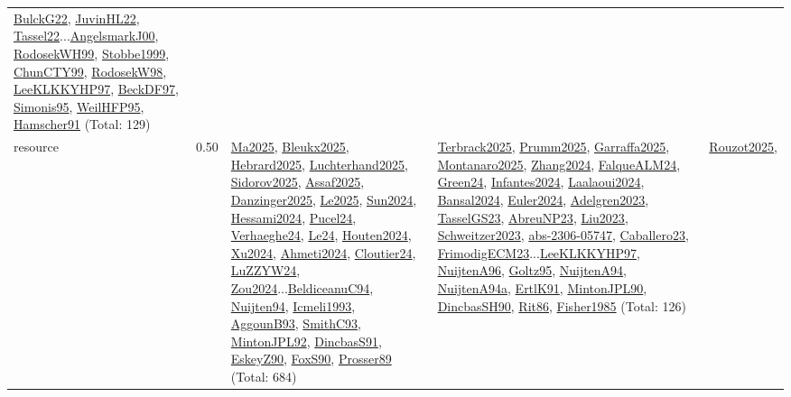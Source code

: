 {\begin{longtable}{p{3cm}r>{\raggedright\arraybackslash}p{6cm}>{\raggedright\arraybackslash}p{6cm}>{\raggedright\arraybackslash}p{8cm}}
\hyperref[detail:BulckG22]{BulckG22}, \hyperref[detail:JuvinHL22]{JuvinHL22}, \hyperref[detail:Tassel22]{Tassel22}...\hyperref[detail:AngelsmarkJ00]{AngelsmarkJ00}, \hyperref[detail:RodosekWH99]{RodosekWH99}, \hyperref[detail:Stobbe1999]{Stobbe1999}, \hyperref[detail:ChunCTY99]{ChunCTY99}, \hyperref[detail:RodosekW98]{RodosekW98}, \hyperref[detail:LeeKLKKYHP97]{LeeKLKKYHP97}, \hyperref[detail:BeckDF97]{BeckDF97}, \hyperref[detail:Simonis95]{Simonis95}, \hyperref[detail:WeilHFP95]{WeilHFP95}, \hyperref[detail:Hamscher91]{Hamscher91} (Total: 129)\\
\index{resource}\index{Scheduling!resource}resource &  0.50 & \hyperref[detail:Ma2025]{Ma2025}, \hyperref[detail:Bleukx2025]{Bleukx2025}, \hyperref[detail:Hebrard2025]{Hebrard2025}, \hyperref[detail:Luchterhand2025]{Luchterhand2025}, \hyperref[detail:Sidorov2025]{Sidorov2025}, \hyperref[detail:Assaf2025]{Assaf2025}, \hyperref[detail:Danzinger2025]{Danzinger2025}, \hyperref[detail:Le2025]{Le2025}, \hyperref[detail:Sun2024]{Sun2024}, \hyperref[detail:Hessami2024]{Hessami2024}, \hyperref[detail:Pucel24]{Pucel24}, \hyperref[detail:Verhaeghe24]{Verhaeghe24}, \hyperref[detail:Le24]{Le24}, \hyperref[detail:Houten2024]{Houten2024}, \hyperref[detail:Xu2024]{Xu2024}, \hyperref[detail:Ahmeti2024]{Ahmeti2024}, \hyperref[detail:Cloutier24]{Cloutier24}, \hyperref[detail:LuZZYW24]{LuZZYW24}, \hyperref[detail:Zou2024]{Zou2024}...\hyperref[detail:BeldiceanuC94]{BeldiceanuC94}, \hyperref[detail:Nuijten94]{Nuijten94}, \hyperref[detail:Icmeli1993]{Icmeli1993}, \hyperref[detail:AggounB93]{AggounB93}, \hyperref[detail:SmithC93]{SmithC93}, \hyperref[detail:MintonJPL92]{MintonJPL92}, \hyperref[detail:DincbasS91]{DincbasS91}, \hyperref[detail:EskeyZ90]{EskeyZ90}, \hyperref[detail:FoxS90]{FoxS90}, \hyperref[detail:Prosser89]{Prosser89} (Total: 684) & \hyperref[detail:Terbrack2025]{Terbrack2025}, \hyperref[detail:Prumm2025]{Prumm2025}, \hyperref[detail:Garraffa2025]{Garraffa2025}, \hyperref[detail:Montanaro2025]{Montanaro2025}, \hyperref[detail:Zhang2024]{Zhang2024}, \hyperref[detail:FalqueALM24]{FalqueALM24}, \hyperref[detail:Green24]{Green24}, \hyperref[detail:Infantes2024]{Infantes2024}, \hyperref[detail:Laalaoui2024]{Laalaoui2024}, \hyperref[detail:Bansal2024]{Bansal2024}, \hyperref[detail:Euler2024]{Euler2024}, \hyperref[detail:Adelgren2023]{Adelgren2023}, \hyperref[detail:TasselGS23]{TasselGS23}, \hyperref[detail:AbreuNP23]{AbreuNP23}, \hyperref[detail:Liu2023]{Liu2023}, \hyperref[detail:Schweitzer2023]{Schweitzer2023}, \hyperref[detail:abs-2306-05747]{abs-2306-05747}, \hyperref[detail:Caballero23]{Caballero23}, \hyperref[detail:FrimodigECM23]{FrimodigECM23}...\hyperref[detail:LeeKLKKYHP97]{LeeKLKKYHP97}, \hyperref[detail:NuijtenA96]{NuijtenA96}, \hyperref[detail:Goltz95]{Goltz95}, \hyperref[detail:NuijtenA94]{NuijtenA94}, \hyperref[detail:NuijtenA94a]{NuijtenA94a}, \hyperref[detail:ErtlK91]{ErtlK91}, \hyperref[detail:MintonJPL90]{MintonJPL90}, \hyperref[detail:DincbasSH90]{DincbasSH90}, \hyperref[detail:Rit86]{Rit86}, \hyperref[detail:Fisher1985]{Fisher1985} (Total: 126) & \hyperref[detail:Rouzot2025]{Rouzot2025}, 
\end{longtable}}
